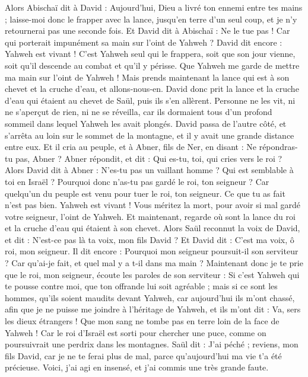 \begin{multicols}{2}
Alors Abischaï dit à David : Aujourd'hui, Dieu a livré ton ennemi entre tes mains ; laisse-moi donc le frapper avec la lance, jusqu'en terre d'un seul coup, et je n'y retournerai pas une seconde fois.
Et David dit à Abischaï : Ne le tue pas ! Car qui porterait impunément sa main sur l'oint de Yahweh ?
David dit encore : Yahweh est vivant ! C'est Yahweh seul qui le frappera, soit que son jour vienne, soit qu'il descende au combat et qu'il y périsse.
Que Yahweh me garde de mettre ma main sur l'oint de Yahweh ! Mais prends maintenant la lance qui est à son chevet et la cruche d'eau, et allons-nous-en.
David donc prit la lance et la cruche d'eau qui étaient au chevet de Saül, puis ils s'en allèrent. Personne ne les vit, ni ne s'aperçut de rien, ni ne se réveilla, car ils dormaient tous d'un profond sommeil dans lequel Yahweh les avait plongés.
David passa de l'autre côté, et s'arrêta au loin sur le sommet de la montagne, et il y avait une grande distance entre eux.
Et il cria au peuple, et à Abner, fils de Ner, en disant : Ne répondras-tu pas, Abner ? Abner répondit, et dit : Qui es-tu, toi, qui cries vers le roi ?
Alors David dit à Abner : N'es-tu pas un vaillant homme ? Qui est semblable à toi en Israël ? Pourquoi donc n'as-tu pas gardé le roi, ton seigneur ? Car quelqu'un du peuple est venu pour tuer le roi, ton seigneur.
Ce que tu as fait n'est pas bien. Yahweh est vivant ! Vous méritez la mort, pour avoir si mal gardé votre seigneur, l'oint de Yahweh. Et maintenant, regarde où sont la lance du roi et la cruche d'eau qui étaient à son chevet.
Alors Saül reconnut la voix de David, et dit : N'est-ce pas là ta voix, mon fils David ? Et David dit : C'est ma voix, ô roi, mon seigneur.
Il dit encore : Pourquoi mon seigneur poursuit-il son serviteur ? Car qu'ai-je fait, et quel mal y a t-il dans ma main ?
Maintenant donc je te prie que le roi, mon seigneur, écoute les paroles de son serviteur : Si c'est Yahweh qui te pousse contre moi, que ton offrande lui soit agréable ; mais si ce sont les hommes, qu'ils soient maudits devant Yahweh, car aujourd'hui ils m'ont chassé, afin que je ne puisse me joindre à l'héritage de Yahweh, et ils m'ont dit : Va, sers les dieux étrangers !
Que mon sang ne tombe pas en terre loin de la face de Yahweh ! Car le roi d'Israël est sorti pour chercher une puce, comme on poursuivrait une perdrix dans les montagnes.
Saül dit : J'ai péché ; reviens, mon fils David, car je ne te ferai plus de mal, parce qu'aujourd'hui ma vie t'a été précieuse. Voici, j'ai agi en insensé, et j'ai commis une très grande faute.

\end{multicols}
